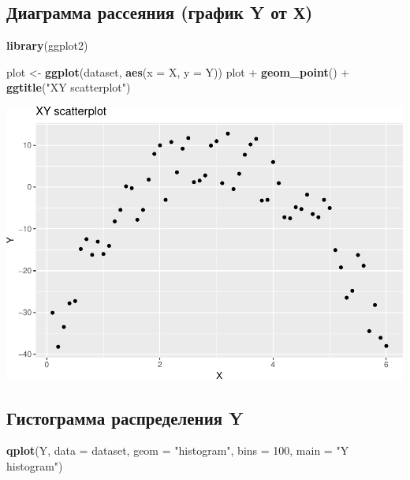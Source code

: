 \documentclass[]{article}
\newenvironment{Shaded}{\begin{snugshade}}{\end{snugshade}}
\newcommand{\KeywordTok}[1]{\textcolor[rgb]{0.13,0.29,0.53}{\textbf{{#1}}}}
\newcommand{\DataTypeTok}[1]{\textcolor[rgb]{0.13,0.29,0.53}{{#1}}}
\newcommand{\DecValTok}[1]{\textcolor[rgb]{0.00,0.00,0.81}{{#1}}}
\newcommand{\StringTok}[1]{\textcolor[rgb]{0.31,0.60,0.02}{{#1}}}
\newcommand{\NormalTok}[1]{{#1}}
\begin{document}
\subsection{Диаграмма рассеяния (график Y от Х)}\label{---y--}

\begin{Shaded}
\begin{Highlighting}[]
\KeywordTok{library}\NormalTok{(ggplot2)}

\NormalTok{plot <-}\StringTok{ }\KeywordTok{ggplot}\NormalTok{(dataset, }\KeywordTok{aes}\NormalTok{(}\DataTypeTok{x =} \NormalTok{X, }\DataTypeTok{y =} \NormalTok{Y))}
\NormalTok{plot +}\StringTok{ }\KeywordTok{geom_point}\NormalTok{() +}\StringTok{ }\KeywordTok{ggtitle}\NormalTok{(}\StringTok{"XY scatterplot"}\NormalTok{)}
\end{Highlighting}
\end{Shaded}

\includegraphics{DZ3_files/figure-latex/unnamed-chunk-2-1.pdf}

\subsection{Гистограмма распределения Y}\label{--y}

\begin{Shaded}
\begin{Highlighting}[]
\KeywordTok{qplot}\NormalTok{(Y, }\DataTypeTok{data =} \NormalTok{dataset, }\DataTypeTok{geom =} \StringTok{"histogram"}\NormalTok{, }\DataTypeTok{bins =} \DecValTok{100}\NormalTok{, }\DataTypeTok{main =} \StringTok{"Y histogram"}\NormalTok{)}
\end{Highlighting}
\end{Shaded}
\end{document}
